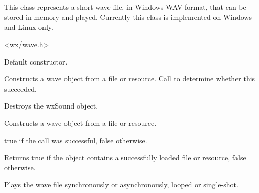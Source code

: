 \section{}\label{wxsound}

This class represents a short wave file, in Windows WAV format, that
can be stored in memory and played. Currently this class is implemented
on Windows and Linux only.




<wx/wave.h>


\label{wxsoundconstr}


Default constructor.


Constructs a wave object from a file or resource. Call  to
determine whether this succeeded.






Destroys the wxSound object.

\label{wxsoundcreate}


Constructs a wave object from a file or resource.





true if the call was successful, false otherwise.

\label{wxsoundisok}


Returns true if the object contains a successfully loaded file or resource, false otherwise.

\label{wxsoundplay}


Plays the wave file synchronously or asynchronously, looped or single-shot.


